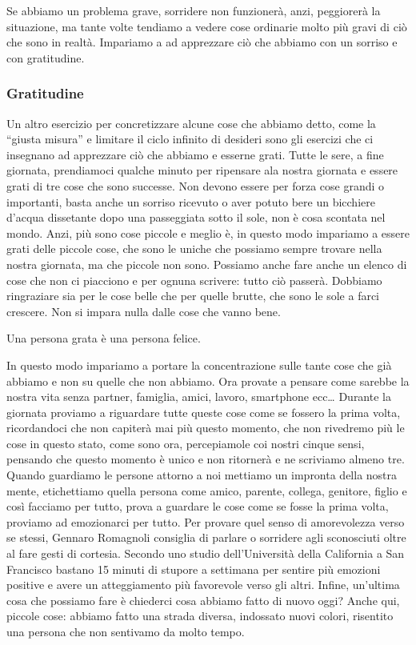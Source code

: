 \documentclass[12pt]{book} %
\begin{document}
Se abbiamo un problema grave, sorridere non funzionerà, anzi, peggiorerà la situazione, ma tante volte tendiamo a vedere
cose ordinarie molto più gravi di ciò che sono in realtà. Impariamo a ad apprezzare ciò che abbiamo con un sorriso e
con gratitudine.

\subsubsection{Gratitudine}
Un altro esercizio per concretizzare alcune cose che abbiamo detto, come la “giusta misura” e limitare il ciclo infinito
di desideri sono gli esercizi che ci insegnano ad apprezzare ciò che abbiamo e esserne grati. Tutte le sere, a fine
giornata, prendiamoci qualche minuto per ripensare ala nostra giornata e essere grati di tre cose che sono successe.
Non devono essere per forza cose grandi o importanti, basta anche un sorriso ricevuto o aver potuto bere un bicchiere
d'acqua dissetante dopo una passeggiata sotto il sole, non è cosa scontata nel mondo. Anzi, più
sono cose piccole e meglio è, in questo modo impariamo a essere grati delle piccole cose, che sono le uniche che
possiamo sempre trovare nella nostra giornata, ma che piccole non sono. Possiamo anche fare anche un elenco di cose che
non ci piacciono e per ognuna scrivere: tutto ciò passerà. Dobbiamo ringraziare sia per le cose belle che per quelle
brutte, che sono le sole a farci crescere. Non si impara nulla dalle cose che vanno bene. 

Una persona grata è una persona felice. 

In questo modo impariamo a portare la concentrazione sulle tante cose che già abbiamo e non su quelle che non abbiamo.
Ora provate a pensare come sarebbe la nostra vita senza partner, famiglia, amici, lavoro, smartphone ecc… Durante la
giornata proviamo a riguardare tutte queste cose come se fossero la prima volta, ricordandoci che non capiterà mai più
questo momento, che non rivedremo più le cose in questo stato, come sono ora, percepiamole coi nostri cinque sensi,
pensando che questo momento è unico e non ritornerà e ne scriviamo almeno tre. Quando guardiamo le persone attorno a
noi mettiamo un impronta della nostra mente, etichettiamo quella persona come amico, parente, collega, genitore, figlio
e così facciamo per tutto, prova a guardare le cose come se fosse la prima volta, proviamo ad emozionarci per tutto.
Per provare quel senso di amorevolezza verso se stessi, Gennaro Romagnoli consiglia di parlare o sorridere agli
sconosciuti oltre al fare gesti di cortesia. Secondo uno studio dell'Università della California a San Francisco
bastano 15 minuti di {\textquotedbl}stupore{\textquotedbl} a settimana per sentire più emozioni positive e avere un
atteggiamento più favorevole verso gli altri. Infine, un'ultima cosa che possiamo fare è chiederci
cosa abbiamo fatto di nuovo oggi? Anche qui, piccole cose: abbiamo fatto una strada diversa, indossato nuovi colori,
risentito una persona che non sentivamo da molto tempo. 
\end{document}
